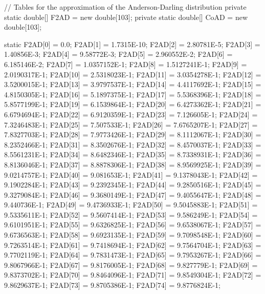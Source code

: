 \begin{code}\begin{hide}
   // Tables for the approximation of the Anderson-Darling distribution 
   private static double[] F2AD = new double[103];
   private static double[] CoAD = new double[103];

   static {
      F2AD[0] = 0.0;
      F2AD[1] = 1.7315E-10;
      F2AD[2] = 2.80781E-5;
      F2AD[3] = 1.40856E-3;
      F2AD[4] = 9.58772E-3;
      F2AD[5] = 2.960552E-2;
      F2AD[6] = 6.185146E-2;
      F2AD[7] = 1.0357152E-1;
      F2AD[8] = 1.5127241E-1;
      F2AD[9] = 2.0190317E-1;
      F2AD[10] = 2.5318023E-1;
      F2AD[11] = 3.0354278E-1;
      F2AD[12] = 3.5200015E-1;
      F2AD[13] = 3.9797537E-1;
      F2AD[14] = 4.4117692E-1;
      F2AD[15] = 4.8150305E-1;
      F2AD[16] = 5.1897375E-1;
      F2AD[17] = 5.5368396E-1;
      F2AD[18] = 5.8577199E-1;
      F2AD[19] = 6.1539864E-1;
      F2AD[20] = 6.4273362E-1;
      F2AD[21] = 6.6794694E-1;
      F2AD[22] = 6.9120359E-1;
      F2AD[23] = 7.126605E-1;
      F2AD[24] = 7.3246483E-1;
      F2AD[25] = 7.507533E-1;
      F2AD[26] = 7.6765207E-1;
      F2AD[27] = 7.8327703E-1;
      F2AD[28] = 7.9773426E-1;
      F2AD[29] = 8.1112067E-1;
      F2AD[30] = 8.2352466E-1;
      F2AD[31] = 8.3502676E-1;
      F2AD[32] = 8.4570037E-1;
      F2AD[33] = 8.5561231E-1;
      F2AD[34] = 8.6482346E-1;
      F2AD[35] = 8.7338931E-1;
      F2AD[36] = 8.8136046E-1;
      F2AD[37] = 8.8878306E-1;
      F2AD[38] = 8.9569925E-1;
      F2AD[39] = 9.0214757E-1;
      F2AD[40] = 9.081653E-1;
      F2AD[41] = 9.1378043E-1;
      F2AD[42] = 9.1902284E-1;
      F2AD[43] = 9.2392345E-1;
      F2AD[44] = 9.2850516E-1;
      F2AD[45] = 9.3279084E-1;
      F2AD[46] = 9.3680149E-1;
      F2AD[47] = 9.4055647E-1;
      F2AD[48] = 9.440736E-1;
      F2AD[49] = 9.4736933E-1;
      F2AD[50] = 9.5045883E-1;
      F2AD[51] = 9.5335611E-1;
      F2AD[52] = 9.5607414E-1;
      F2AD[53] = 9.586249E-1;
      F2AD[54] = 9.6101951E-1;
      F2AD[55] = 9.6326825E-1;
      F2AD[56] = 9.6538067E-1;
      F2AD[57] = 9.6736563E-1;
      F2AD[58] = 9.6923135E-1;
      F2AD[59] = 9.7098548E-1;
      F2AD[60] = 9.7263514E-1;
      F2AD[61] = 9.7418694E-1;
      F2AD[62] = 9.7564704E-1;
      F2AD[63] = 9.7702119E-1;
      F2AD[64] = 9.7831473E-1;
      F2AD[65] = 9.7953267E-1;
      F2AD[66] = 9.8067966E-1;
      F2AD[67] = 9.8176005E-1;
      F2AD[68] = 9.827779E-1;
      F2AD[69] = 9.8373702E-1;
      F2AD[70] = 9.8464096E-1;
      F2AD[71] = 9.8549304E-1;
      F2AD[72] = 9.8629637E-1;
      F2AD[73] = 9.8705386E-1;
      F2AD[74] = 9.8776824E-1;
}
\end{hide}
\end{code}
